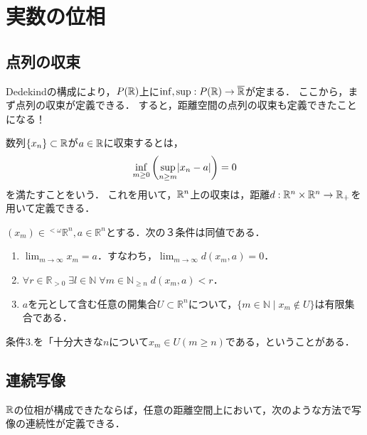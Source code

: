 \documentclass[uplatex,dvipdfmx]{jsreport}
\begin{document}
\section{実数の位相}

\subsection{点列の収束}

\begin{tcolorbox}[colframe=ForestGreen, colback=ForestGreen!10!white,breakable,colbacktitle=ForestGreen!40!white,coltitle=black,fonttitle=\bfseries\sffamily,
title=]
    Dedekindの構成により，$P(\mathbb{R})$上に$\inf,\sup:P(\mathbb{R})\to\overline{\mathbb{R}}$が定まる．
    ここから，まず点列の収束が定義できる．
    すると，距離空間の点列の収束も定義できたことになる！
\end{tcolorbox}

\begin{definition}
    数列$\{x_n\}\subset\mathbb{R}$が$a\in\mathbb{R}$に収束するとは，
    \[\inf_{m\ge0}\left(\sup_{n\ge m}\lvert x_n-a\rvert\right)=0\]
    を満たすことをいう．
    これを用いて，$\mathbb{R}^n$上の収束は，距離$d:\mathbb{R}^n\times\mathbb{R}^n\to\mathbb{R}_+$を用いて定義できる．
\end{definition}

\begin{proposition}[点列の収束の位相的特徴付け]\label{prop-characterization-of-convergence-in-metric-spaces}
    $(x_m)\in{}^{<\omega}\mathbb{R}^n, a\in\mathbb{R}^n$とする．次の３条件は同値である．
    \begin{enumerate}
        \item $\lim_{m\to\infty}x_m=a$．すなわち，$\lim_{m\to\infty}d(x_m,a)=0$．
        \item $\forall r\in\mathbb{R}_{>0}\;\exists l\in\mathbb{N}\;\forall m\in\mathbb{N}_{\ge n}\; d(x_m,a)<r$．
        \item $a$を元として含む任意の開集合$U\subset\mathbb{R}^n$について，$\{m\in\mathbb{N}\mid x_m\notin U\}$は有限集合である．
    \end{enumerate}
    条件3.を「十分大きな$n$について$x_m\in U (m\ge n)$である，ということがある．
\end{proposition}

\subsection{連続写像}

\begin{tcolorbox}[colframe=ForestGreen, colback=ForestGreen!10!white,breakable,colbacktitle=ForestGreen!40!white,coltitle=black,fonttitle=\bfseries\sffamily,
title=]
    $\mathbb{R}$の位相が構成できたならば，任意の距離空間上において，次のような方法で写像の連続性が定義できる．
\end{tcolorbox}
\end{document}
